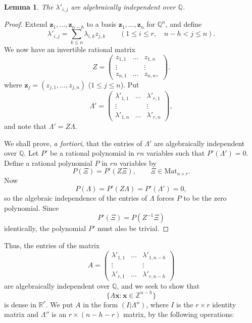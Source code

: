 \documentclass[12pt,reqno]{amsart}
\newtheorem{lemma}[thm]{Lemma}
\theoremstyle{definition}
\theoremstyle{remark}
\numberwithin{equation}{section}
\begin{document}
\begin{lemma} The ${{\lambda}}'_{i,j}$ are algebraically independent over ${\mathbb Q}$.
\end{lemma}

\begin{proof}
Extend ${\mathbf z}_1, \ldots, {\mathbf z}_{n-h}$ to a basis ${\mathbf z}_1, \ldots, {\mathbf z}_n$ for ${\mathbb Q}^n$, and define
\[
{{\lambda}}'_{i,j} = \sum_{k {\leqslant} n} {{\lambda}}_{i,k} z_{j,k} \qquad (1 {\leqslant} i {\leqslant} r, \quad n-h < j {\leqslant} n).
\]
We now have an invertible rational matrix
\[
Z = \begin{pmatrix} z_{1,1} & \ldots & z_{1,n} \\
\vdots & & \vdots \\
z_{n,1} & \ldots & z_{n,n},
\end{pmatrix}.
\]
where ${\mathbf z}_j = (z_{j,1}, \ldots, z_{j,n})$ ($1 {\leqslant} j {\leqslant} n$). Put
\[
{{\Lambda}}' = \begin{pmatrix} {{\lambda}}'_{1,1} & \ldots & {{\lambda}}'_{r,1} \\
\vdots & & \vdots \\
{{\lambda}}'_{1,n} & \ldots & {{\lambda}}'_{r,n}
\end{pmatrix},
\]
and note that ${{\Lambda}}' = Z {{\Lambda}}$.

We shall prove, \emph{a fortiori}, that the entries of ${{\Lambda}}'$ are algebraically independent over ${\mathbb Q}$. Let $P'$ be a rational polynomial in $rn$ variables such that $P'({{\Lambda}}') = 0$. Define a rational polynomial $P$ in $rn$ variables by
\[
P(\Xi) = P'(Z \Xi), \qquad 
\Xi \in \mathrm{Mat}_{n \times r}.
\]
Now
\[
P({{\Lambda}}) = P'(Z{{\Lambda}}) = P'({{\Lambda}}') = 0,
\]
so the algebraic independence of the entries of ${{\Lambda}}$ forces $P$ to be the zero polynomial. Since
\[
P'(\Xi) = P(Z^{-1} \Xi)
\]
identically, the polynomial $P'$ must also be trivial.
\end{proof}

Thus, the entries of the matrix
\[
A = \begin{pmatrix}
{{\lambda}}'_{1,1} &\ldots & {{\lambda}}'_{1,n-h} \\
\vdots && \vdots \\
{{\lambda}}'_{r,1} &\ldots & {{\lambda}}'_{r,n-h}
\end{pmatrix}
\]
are algebraically independent over ${\mathbb Q}$, and we seek to show that 
\[
\{ A {\mathbf x} : {\mathbf x} \in {\mathbb Z}^{n-h} \}
\]
is dense in ${\mathbb R}^r$. We put $A$ in the form $(I | {{\Lambda}}'')$, where $I$ is the $r \times r$ identity matrix and ${{\Lambda}}''$ is an $r \times (n-h-r)$ matrix, by the following operations:
\end{document}
